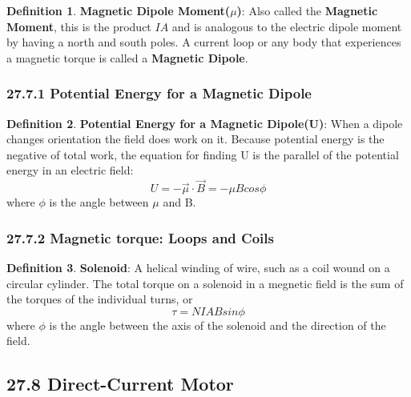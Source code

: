 \documentclass[12pt]{amsart}
\theoremstyle{definition}
\newtheorem{definition}{Definition} %
\numberwithin{equation}{theorem}    %
\begin{document}
\begin{definition}
    \textbf{Magnetic Dipole Moment($\mu$)}:
    Also called the \textbf{Magnetic Moment}, this is the product $IA$ and is analogous to the electric dipole moment by having a north and south poles. A current loop or any body that experiences a magnetic torque is called a \textbf{Magnetic Dipole}.
\end{definition}

\subsubsection*{27.7.1 Potential Energy for a Magnetic Dipole}

\begin{definition}
    \textbf{Potential Energy for a Magnetic Dipole(U)}:
    When a dipole changes orientation the field does work on it. Because potential energy is the negative of total work, the equation for finding U is the parallel of the potential energy in an electric field: 
    $$U = -\vec{\mu}\cdot \vec{B} = -\mu Bcos\phi$$
    where $\phi$ is the angle between $\mu$ and B.
\end{definition}

\subsubsection*{27.7.2 Magnetic torque: Loops and Coils}

\begin{definition}
    \textbf{Solenoid}:
    A helical winding of wire, such as a coil wound on a circular cylinder. The total torque on a solenoid in a megnetic field is the sum of the torques of the individual turns, or $$\tau = NIABsin\phi$$ where $\phi$ is the angle between the axis of the solenoid and the direction of the field.
\end{definition}

\subsection*{27.8 Direct-Current Motor}
\end{document}

